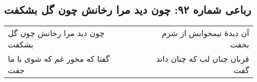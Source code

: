 \begin{center}
\section*{رباعی شماره ۹۲: چون دید مرا رخانش چون گل بشکفت}
\label{sec:sh092}
\begin{longtable}{l p{0.5cm} r}
چون دید مرا رخانش چون گل بشکفت
&&
آن دیدهٔ نیمخوابش از شرم بخفت
\\
گفتا که مخور غم که شوی با ما جفت
&&
قربان چنان لب که چنان داند گفت
\\
\end{longtable}
\end{center}
